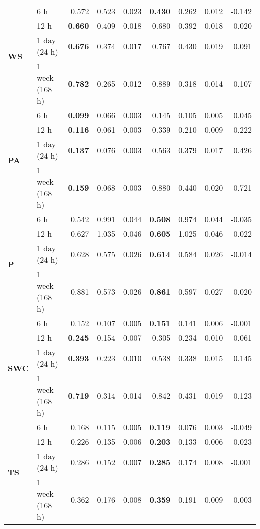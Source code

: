 \begin{table}
\begin{tabular}{p{2.1cm}l|rrr|rrr|r}
\cline{1-9}
\multirow[c]{4}{*}{\textbf{WS}} & 6 h & 0.572 & 0.523 & 0.023 & \bfseries 0.430 & 0.262 & 0.012 & -0.142 \\
 & 12 h & \bfseries 0.660 & 0.409 & 0.018 & 0.680 & 0.392 & 0.018 & 0.020 \\
 & 1 day (24 h) & \bfseries 0.676 & 0.374 & 0.017 & 0.767 & 0.430 & 0.019 & 0.091 \\
 & 1 week (168 h) & \bfseries 0.782 & 0.265 & 0.012 & 0.889 & 0.318 & 0.014 & 0.107 \\
\cline{1-9}
\multirow[c]{4}{*}{\textbf{PA}} & 6 h & \bfseries 0.099 & 0.066 & 0.003 & 0.145 & 0.105 & 0.005 & 0.045 \\
 & 12 h & \bfseries 0.116 & 0.061 & 0.003 & 0.339 & 0.210 & 0.009 & 0.222 \\
 & 1 day (24 h) & \bfseries 0.137 & 0.076 & 0.003 & 0.563 & 0.379 & 0.017 & 0.426 \\
 & 1 week (168 h) & \bfseries 0.159 & 0.068 & 0.003 & 0.880 & 0.440 & 0.020 & 0.721 \\
\cline{1-9}
\multirow[c]{4}{*}{\textbf{P}} & 6 h & 0.542 & 0.991 & 0.044 & \bfseries 0.508 & 0.974 & 0.044 & -0.035 \\
 & 12 h & 0.627 & 1.035 & 0.046 & \bfseries 0.605 & 1.025 & 0.046 & -0.022 \\
 & 1 day (24 h) & 0.628 & 0.575 & 0.026 & \bfseries 0.614 & 0.584 & 0.026 & -0.014 \\
 & 1 week (168 h) & 0.881 & 0.573 & 0.026 & \bfseries 0.861 & 0.597 & 0.027 & -0.020 \\
\cline{1-9}
\multirow[c]{4}{*}{\textbf{SWC}} & 6 h & 0.152 & 0.107 & 0.005 & \bfseries 0.151 & 0.141 & 0.006 & -0.001 \\
 & 12 h & \bfseries 0.245 & 0.154 & 0.007 & 0.305 & 0.234 & 0.010 & 0.061 \\
 & 1 day (24 h) & \bfseries 0.393 & 0.223 & 0.010 & 0.538 & 0.338 & 0.015 & 0.145 \\
 & 1 week (168 h) & \bfseries 0.719 & 0.314 & 0.014 & 0.842 & 0.431 & 0.019 & 0.123 \\
\cline{1-9}
\multirow[c]{4}{*}{\textbf{TS}} & 6 h & 0.168 & 0.115 & 0.005 & \bfseries 0.119 & 0.076 & 0.003 & -0.049 \\
 & 12 h & 0.226 & 0.135 & 0.006 & \bfseries 0.203 & 0.133 & 0.006 & -0.023 \\
 & 1 day (24 h) & 0.286 & 0.152 & 0.007 & \bfseries 0.285 & 0.174 & 0.008 & -0.001 \\
 & 1 week (168 h) & 0.362 & 0.176 & 0.008 & \bfseries 0.359 & 0.191 & 0.009 & -0.003 \\
\cline{1-9}
\bottomrule
\end{tabular}
\end{table}
